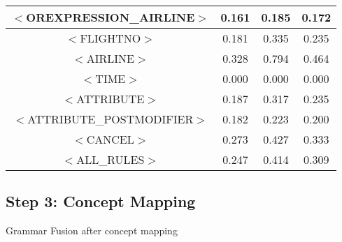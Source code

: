\documentclass[a4paper,10pt]{article}
\begin{document}
\begin{center}
\begin{tabular}{|c||c|c|c|}
\hline$<$OREXPRESSION\_AIRLINE$>$&0.161&0.185&0.172 \\
\hline$<$FLIGHTNO$>$&0.181&0.335&0.235 \\
\hline$<$AIRLINE$>$&0.328&0.794&0.464 \\
\hline$<$TIME$>$&0.000&0.000&0.000 \\
\hline$<$ATTRIBUTE$>$&0.187&0.317&0.235 \\
\hline$<$ATTRIBUTE\_POSTMODIFIER$>$&0.182&0.223&0.200 \\
\hline$<$CANCEL$>$&0.273&0.427&0.333 \\
\hline
\hline
$<$ALL\_RULES$>$&0.247&0.414&0.309 \\
\hline
\end{tabular}
\end{center}
\pagebreak
\subsection{Step 3: Concept Mapping}
Grammar Fusion after concept mapping
\end{document}
